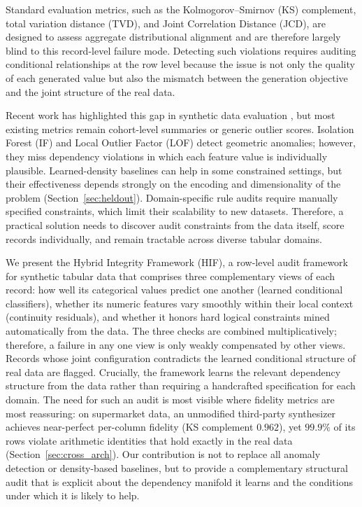 \documentclass[pdflatex,sn-mathphys-num]{sn-jnl}
\theoremstyle{thmstyleone}%
\theoremstyle{thmstyletwo}%
\theoremstyle{thmstylethree}%
\begin{document}
Standard evaluation metrics, such as the Kolmogorov--Smirnov (KS) complement, total variation distance (TVD), and Joint Correlation Distance (JCD), are designed to assess aggregate distributional alignment and are therefore largely blind to this record-level failure mode. Detecting such violations requires auditing conditional relationships at the row level because the issue is not only the quality of each generated value but also the mismatch between the generation objective and the joint structure of the real data.

Recent work has highlighted this gap in synthetic data evaluation \cite{long2025evaluating}, but most existing metrics remain cohort-level summaries or generic outlier scores. Isolation Forest (IF) and Local Outlier Factor (LOF) \cite{liu2008isolation, breunig2000lof} detect geometric anomalies; however, they miss dependency violations in which each feature value is individually plausible. Learned-density baselines can help in some constrained settings, but their effectiveness depends strongly on the encoding and dimensionality of the problem (Section~\ref{sec:heldout}). Domain-specific rule audits require manually specified constraints, which limit their scalability to new datasets. Therefore, a practical solution needs to discover audit constraints from the data itself, score records individually, and remain tractable across diverse tabular domains.

We present the Hybrid Integrity Framework (HIF), a row-level audit framework for synthetic tabular data that comprises three complementary views of each record: how well its categorical values predict one another (learned conditional classifiers), whether its numeric features vary smoothly within their local context (continuity residuals), and whether it honors hard logical constraints mined automatically from the data. The three checks are combined multiplicatively; therefore, a failure in any one view is only weakly compensated by other views. Records whose joint configuration contradicts the learned conditional structure of real data are flagged. Crucially, the framework learns the relevant dependency structure from the data rather than requiring a handcrafted specification for each domain. The need for such an audit is most visible where fidelity metrics are most reassuring: on supermarket data, an unmodified third-party synthesizer achieves near-perfect per-column fidelity (KS complement $0.962$), yet $99.9\%$ of its rows violate arithmetic identities that hold exactly in the real data (Section~\ref{sec:cross_arch}). Our contribution is not to replace all anomaly detection or density-based baselines, but to provide a complementary structural audit that is explicit about the dependency manifold it learns and the conditions under which it is likely to help.
\end{document}

